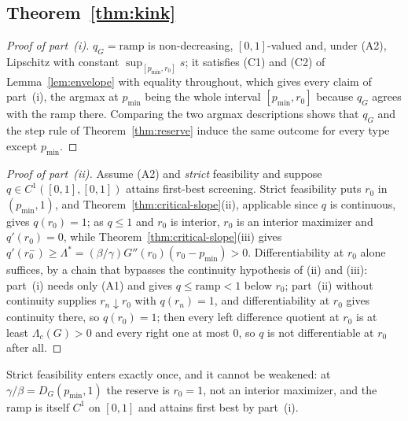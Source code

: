 \documentclass[acmsmall,nonacm,screen]{acmart}
\theoremstyle{acmplain}%
\theoremstyle{acmdefinition}%
\numberwithin{equation}{section}
\begin{document}
\begin{appendix}
\subsection{Theorem~\ref{thm:kink}}\label{app:kink}

\begin{proof}[Proof of part~(i)]
$q_G = \mathrm{ramp}$ is non-decreasing, $[0,1]$-valued and, under (A2), Lipschitz with constant $\sup_{[p_{\min},r_0]}s$; it satisfies (C1) and (C2) of Lemma~\ref{lem:envelope} with equality throughout, which gives every claim of part~(i), the argmax at $p_{\min}$ being the whole interval $[p_{\min},r_0]$ because $q_G$ agrees with the ramp there. Comparing the two argmax descriptions shows that $q_G$ and the step rule of Theorem~\ref{thm:reserve} induce the same outcome for every type except $p_{\min}$.
\end{proof}

\begin{proof}[Proof of part~(ii)]
Assume (A2) and \emph{strict} feasibility and suppose $q\in C^1([0,1],[0,1])$ attains first-best screening. Strict feasibility puts $r_0$ in $(p_{\min},1)$, and Theorem~\ref{thm:critical-slope}(ii), applicable since $q$ is continuous, gives $q(r_0)=1$; as $q\leq1$ and $r_0$ is interior, $r_0$ is an interior maximizer and $q'(r_0)=0$, while Theorem~\ref{thm:critical-slope}(iii) gives $q'(r_0^-)\geq\Lambda^*=(\beta/\gamma)G''(r_0)(r_0-p_{\min})>0$. Differentiability at $r_0$ alone suffices, by a chain that bypasses the continuity hypothesis of (ii) and (iii): part~(i) needs only (A1) and gives $q\leq\mathrm{ramp}<1$ below $r_0$; part~(ii) without continuity supplies $r_n\downarrow r_0$ with $q(r_n)=1$, and differentiability at $r_0$ gives continuity there, so $q(r_0)=1$; then every left difference quotient at $r_0$ is at least $\Lambda_c(G)>0$ and every right one at most $0$, so $q$ is not differentiable at $r_0$ after all.
\end{proof}

Strict feasibility enters exactly once, and it cannot be weakened: at $\gamma/\beta=D_G(p_{\min},1)$ the reserve is $r_0=1$, not an interior maximizer, and the ramp is itself $C^1$ on $[0,1]$ and attains first best by part~(i).


\end{appendix}
\end{document}
